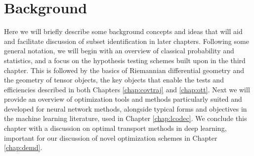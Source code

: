 \chapter{Background}\label{chap:bknd}

Here we will briefly describe some background concepts and ideas that will aid and facilitate discussion of subset identification in later chapters. 
Following some general notation,
we will begin with an overview
of classical probability and statistics,
and a focus on the hypothesis testing
schemes built upon in the third chapter.
This is followed by the basics of Riemannian differential geometry
and the geometry of tensor objects,
the key objects that enable the 
tests and efficiencies described in both 
Chapters \ref{chap:covtraj} and \ref{chap:ott}.
Next we will provide
an overview of optimization tools
and methods particularly suited
and developed for neural network methods,
alongside typical forms and objectives 
in the machine learning literature,
used in Chapter \ref{chap:lcodec}.
We conclude this chapter
with a discussion on optimal transport
methods in deep learning, important
for our discussion of novel optimization schemes
in Chapter \ref{chap:demd}.


